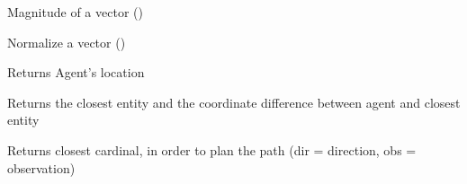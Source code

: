 \documentclass[letterpaper,10pt,english]{sphinxmanual}
\begin{document}

\begin{fulllineitems}
\label{\detokenize{index:heuristics.magnitude}}
Magnitude of a vector ()

\end{fulllineitems}


\begin{fulllineitems}
\label{\detokenize{index:heuristics.normalize}}
Normalize a vector ()

\end{fulllineitems}


\begin{fulllineitems}
\label{\detokenize{index:heuristics.get_player_location}}
Returns Agent’s location

\end{fulllineitems}


\begin{fulllineitems}
\label{\detokenize{index:heuristics.get_closest_entity}}
Returns the closest entity and the coordinate difference between agent and closest entity

\end{fulllineitems}


\begin{fulllineitems}
\label{\detokenize{index:heuristics.closest_cardinals}}
Returns closest cardinal, in order to plan the path (dir = direction, obs = observation)

\end{fulllineitems}
\end{document}
